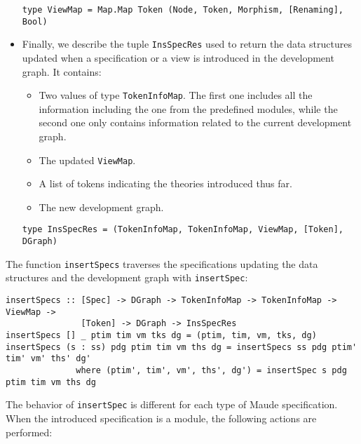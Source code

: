 \begin{itemize}
{\codesize
\begin{verbatim}
type ViewMap = Map.Map Token (Node, Token, Morphism, [Renaming], Bool)
\end{verbatim}
}

\item Finally, we describe the tuple \verb"InsSpecRes"
used to return the data structures
updated when a specification or a view is introduced in the development
graph. It contains:

\begin{itemize}
\item Two values of type \verb"TokenInfoMap". The first one includes all
the information including the one from the predefined modules, while the
second one only contains information related to the current development
graph.
\item The updated \verb"ViewMap".
\item A list of tokens indicating the theories introduced thus far.
\item The new development graph.
\end{itemize}

{\codesize
\begin{verbatim}
type InsSpecRes = (TokenInfoMap, TokenInfoMap, ViewMap, [Token], DGraph)
\end{verbatim}
}

\end{itemize}

The function \verb"insertSpecs" traverses the specifications updating the
data structures and the development graph with \verb"insertSpec":

{\codesize
\begin{verbatim}
insertSpecs :: [Spec] -> DGraph -> TokenInfoMap -> TokenInfoMap -> ViewMap ->
               [Token] -> DGraph -> InsSpecRes
insertSpecs [] _ ptim tim vm tks dg = (ptim, tim, vm, tks, dg)
insertSpecs (s : ss) pdg ptim tim vm ths dg = insertSpecs ss pdg ptim' tim' vm' ths' dg'
              where (ptim', tim', vm', ths', dg') = insertSpec s pdg ptim tim vm ths dg
\end{verbatim}
}

The behavior of \verb"insertSpec" is different for each type of Maude
specification. When the introduced specification is a module, the
following actions are performed:

